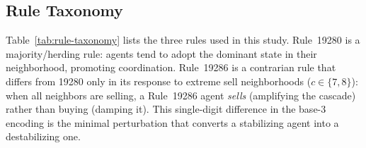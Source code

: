 \subsection{Rule Taxonomy}

Table~\ref{tab:rule-taxonomy} lists the three rules used in this study. Rule~19280
is a majority/herding rule: agents tend to adopt the dominant state in their
neighborhood, promoting coordination. Rule~19286 is a contrarian rule that differs
from 19280 only in its response to extreme sell neighborhoods
($c \in \{7,8\}$): when all neighbors are selling, a Rule~19286 agent \emph{sells}
(amplifying the cascade) rather than buying (damping it). This single-digit difference
in the base-3 encoding is the minimal perturbation that converts a stabilizing agent
into a destabilizing one.
